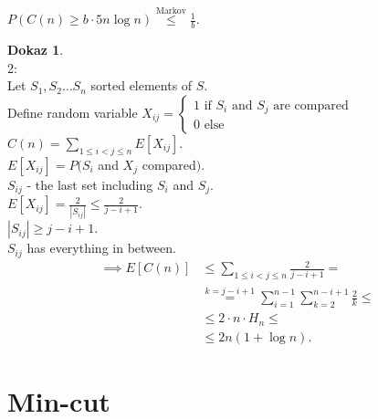 \documentclass[a4paper, 12pt]{book}
\theoremstyle{definition}
\newtheorem{pro}[counter]{Dokaz}
\theoremstyle{remark}
\begin{document}
$P\left(C(n) \geq b \cdot 5n \log n\right) \stackrel{\text{Markov}}{\leq} \frac{1}{b}$.
\begin{pro} \text{} \\
  2: \\
  Let $S_1, S_2 \dots S_n$ sorted elements of $S$. \\
  Define random variable
  $X_{ij} = \begin{cases}
    1 \text{ if $S_i$ and $S_j$ are compared} \\
    0 \text{ else}
  \end{cases}$ \\
  $C(n) = \sum_{1 \leq i < j \leq n} E[X_{ij}]$. \\
  $E[X_{ij}] = P(S_i$ and $X_j$ compared$)$. \\
  $S_{ij}$ - the last set including $S_i$ and $S_j$. \\
  $E[X_{ij}] = \frac{2}{|S_{ij}|} \leq \frac{2}{j-i+1}$. \\
  $|S_{ij}| \geq j - i + 1$. \\
  $S_{ij}$ has everything in between. \\
  \begin{align*}
    \implies E[C(n)] &\leq \sum_{1 \leq i < j \leq n} \frac{2}{j-i+1} = \\
    &\stackrel{k=j-i+1}{=} \sum_{i=1}^{n-1} \sum_{k=2}^{n-i+1} \frac{2}{k} \leq \\
    &\leq 2 \cdot n \cdot H_n \leq \\
    &\leq 2 n (1 + \log n).
  \end{align*}
\end{pro}



\section{Min-cut}
\end{document}
